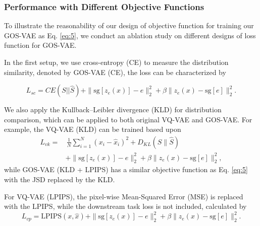 \subsubsection{Performance with Different Objective Functions}
To illustrate the reasonability of our design of objective function for training our GOS-VAE as Eq. \eqref{eq:5}, we conduct an ablation study on different designs of loss function for GOS-VAE.

In the first setup, we use cross-entropy (CE) to measure the distribution similarity, denoted by GOS-VAE (CE), the loss can be characterized by

\vspace{-4mm}
\begin{equation}
L_{sc} = CE(S || \hat{S}) + \|\text{sg}[z_e(x)] - e\|_2^2 + \beta \|z_e(x) - \text{sg}[e]\|_2^2.
\end{equation}
\vspace{-4mm}

We also apply the Kullback–Leibler divergence (KLD) for distribution comparison, which can be applied to both original VQ-VAE and GOS-VAE. For example, the VQ-VAE (KLD) can be trained based upon 
\begin{align}
L_{vk} = & \, \frac{1}{N} \sum_{i=1}^{N} (x_i - \hat{x}_i)^2 + D_{KL}(S \parallel \hat{S}) \nonumber \\
        & + \|\text{sg}[z_e(x)] - e\|_2^2 + \beta \|z_e(x) - \text{sg}[e]\|_2^2,
\end{align}
while GOS-VAE (KLD + LPIPS) has a similar objective function as Eq. \eqref{eq:5} with the JSD replaced by the KLD.

For VQ-VAE (LPIPS), the pixel-wise Mean-Squared Error (MSE) is replaced with the LPIPS, while the downstream task loss is not included, calculated by
\begin{equation}
L_{vp} = \text{LPIPS}(x, \hat{x}) + \|\text{sg}[z_e(x)] - e\|_2^2 + \beta \|z_e(x) - \text{sg}[e]\|_2^2.
\end{equation}


